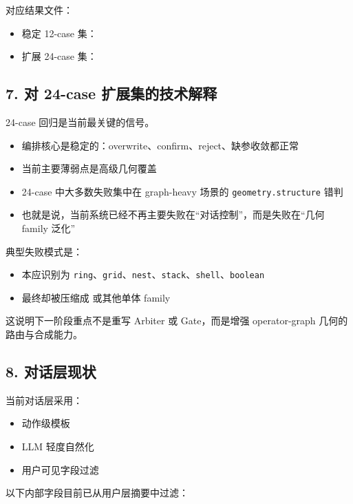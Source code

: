 \documentclass[11pt,a4paper]{ctexart}
\begin{document}
对应结果文件：

\begin{itemize}
\item 稳定 12-case 集：
\item 扩展 24-case 集：
\end{itemize}

\subsection*{7. 对 24-case 扩展集的技术解释}

24-case 回归是当前最关键的信号。

\begin{itemize}
\item 编排核心是稳定的：overwrite、confirm、reject、缺参收敛都正常
\item 当前主要薄弱点是高级几何覆盖
\item 24-case 中大多数失败集中在 graph-heavy 场景的 \texttt{geometry.structure} 错判
\item 也就是说，当前系统已经不再主要失败在“对话控制”，而是失败在“几何 family 泛化”
\end{itemize}

典型失败模式是：

\begin{itemize}
\item 本应识别为 \texttt{ring}、\texttt{grid}、\texttt{nest}、\texttt{stack}、\texttt{shell}、\texttt{boolean}
\item 最终却被压缩成  或其他单体 family
\end{itemize}

这说明下一阶段重点不是重写 Arbiter 或 Gate，而是增强 operator-graph 几何的路由与合成能力。

\subsection*{8. 对话层现状}

当前对话层采用：

\begin{itemize}
\item 动作级模板
\item LLM 轻度自然化
\item 用户可见字段过滤
\end{itemize}

以下内部字段目前已从用户层摘要中过滤：
\end{document}
